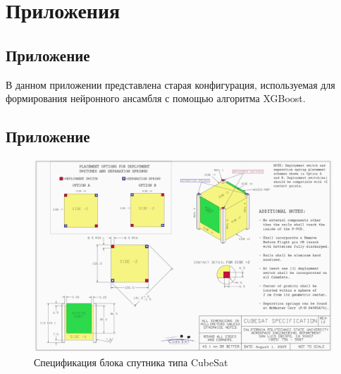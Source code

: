 \renewcommand{\chaptermark}[1]{\markboth{}{}}
\renewcommand{\sectionmark}[1]{\markright{\arabic{section}.\ #1}}

\titleformat{\section}[block]{\large\bfseries\filcenter}{}{0em}{}
\chapter*{Приложения}

\section{Приложение }
\label{subsec:old_polaris_learn_config}

В данном приложении представлена старая конфигурация, используемая для формирования нейронного ансамбля с помощью алгоритма XGBoost.

%

\section{Приложение }
\label{subsec:attachement_cubesat_design}

\begin{figure}
    \centering
    \includegraphics[width=1.0\linewidth]{img/cubesat_design.png}
    \caption{Спецификация блока спутника типа CubeSat}
\end{figure}




